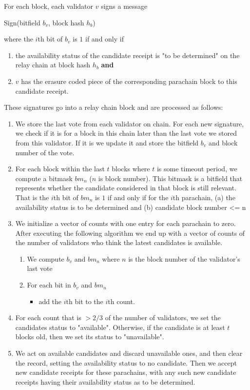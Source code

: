 For each block, each validator $v$ signs a message

Sign(bitfield $b_v$, block hash $h_b$)

where the $i$th bit of $b_v$ is $1$ if and only if 

\begin{enumerate}
\item the availability status of the candidate receipt is "to be determined" on the relay chain at block hash $h_b$ \textbf{and}

\item $v$ has the erasure coded piece of the corresponding parachain block to this candidate receipt.
\end{enumerate}

These signatures go into a relay chain block and are processed as follows:

\begin{enumerate}
\item We store the last vote from each validator on chain. For each new signature, we check if it is for a block in this chain later than the last vote we stored from this validator. If it is we update it and store the bitfield $b_v$ and block number of the vote.

\item For each block within the last $t$ blocks where $t$ is some timeout period, we compute a bitmask $bm_n$ ($n$ is block number). This bitmask is a bitfield that represents whether the candidate considered in that block is still relevant. That is the $i$th bit of $bm_n$ is $1$ if and only if for the $i$th parachain, 
    (a) the availability status is to be determined and
    (b) candidate block number <= n  
    
\item We initialize a vector of counts with one entry for each parachain to zero. After executing the following algorithm we end up with a vector of counts  of the number of validators who think the latest candidates is available. 
	\begin{enumerate}
    \item We compute 
    $b_v$ and $bm_n$ 
    where $n$ is the block number of the validator's last vote
   \item For each bit in $b_v$ and $bm_n$
		\begin{itemize}
        \item add the $i$th bit to the $i$th count.
        \end{itemize}
	\end{enumerate}
		
\item For each count that is $>2/3$ of the number of validators, we set the candidates status to "available". Otherwise, if the candidate is at least $t$ blocks old, then we set its status to "unavailable".

\item We act on available candidates and discard unavailable ones, and then clear the record, setting the availability status to no candidate. Then we accept new candidate receipts for these parachains, with any such new candidate receipts having their availability status as to be determined.
\end{enumerate}

